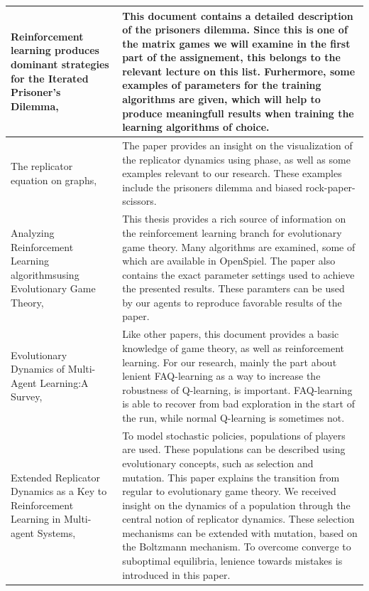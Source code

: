 \documentclass[10pt,a4paper]{article}
\begin{document}
\begin{longtable}{|p{4cm}|p{12cm}|}
\hline  
Reinforcement learning produces dominant strategies for the Iterated Prisoner’s Dilemma, \citet{rlforpd} & 
This document contains a detailed description of the prisoners dilemma. Since this is one of the matrix games we will examine in the first part of the assignement, this belongs to the relevant lecture on this list. Furhermore, some examples of parameters for the training algorithms are given, which will help to produce meaningfull results when training the learning algorithms of choice.\\ 
\hline 
The replicator equation on graphs, \citet{Ohtsuki2006TheRE} & The paper provides an insight on the visualization of the replicator dynamics using phase, as well as some examples relevant to our research. These examples include the prisoners dilemma and biased rock-paper-scissors.\\
\hline
Analyzing Reinforcement Learning algorithmsusing Evolutionary Game Theory, \citet{bloembergenmaster} & This thesis provides a rich source of information on the reinforcement learning branch for evolutionary game theory. Many algorithms are examined, some of which are available in OpenSpiel. The paper also contains the exact parameter settings used to achieve the presented results. These paramters can be used by our agents to reproduce favorable results of the paper. \\
\hline
Evolutionary Dynamics of Multi-Agent Learning:A Survey, \citet{evoldynamics} & Like other papers, this document provides a basic knowledge of game theory, as well as reinforcement learning. For our research, mainly the part about lenient FAQ-learning as a way to increase the robustness of Q-learning, is important. FAQ-learning is able to recover from bad exploration in the start of the run, while normal Q-learning is sometimes not. \\
\hline
Extended Replicator Dynamics as a Key to Reinforcement Learning in Multi-agent Systems, \citet{extrepl} & To model stochastic policies, populations of players are used. These populations can be described using evolutionary concepts, such as selection and mutation. This paper explains the transition from regular to evolutionary game theory. We received insight on the dynamics of a population through the central notion of replicator dynamics. These selection mechanisms can be extended with mutation, based on the Boltzmann mechanism. To overcome converge to suboptimal equilibria, lenience towards mistakes is introduced in this paper.
\\ 
\hline
\end{longtable} 
\end{document}

